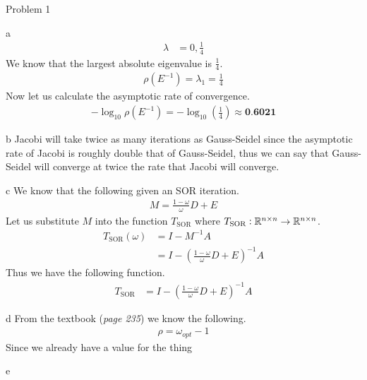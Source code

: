\begin{section}{Problem 1}
\begin{solution}{a}
\begin{align*}
            \lambda &= 0, \frac{1}{4}
        \end{align*}
        We know that the largest absolute eigenvalue is $\frac{1}{4}$.
        \begin{align*}
            \rho \left( E^{-1} \right) = \lambda_1 = \frac{1}{4}
        \end{align*}
        Now let us calculate the asymptotic rate of convergence.
        \begin{align*}
            - \log_{10} \rho \left( E^{-1} \right) = - \log_{10} \left( \frac{1}{4} \right) \approx \textbf{0.6021}
        \end{align*}
    \end{solution}

    \newpage

    \begin{solution}{b}
        Jacobi will take twice as many iterations as Gauss-Seidel since the asymptotic rate of Jacobi is roughly double that of Gauss-Seidel, thus we can say that Gauss-Seidel will converge at twice the rate that Jacobi will converge. 
    \end{solution}

    \newpage

    \begin{solution}{c}
        We know that the following given an SOR iteration.
        \begin{align*}
            M = \frac{1 - \omega}{\omega} D + E
        \end{align*}
        Let us substitute $M$ into the function $T_\text{SOR}$ where $T_\text{SOR} : \mathbb{R}^{n \times n} \rightarrow \mathbb{R}^{n \times n}$.
        \begin{align*}
            T_\text{SOR} (\omega) &= I - M^{-1} A \\
            &= I - \left( \frac{1 - \omega}{\omega} D + E \right)^{-1} A
        \end{align*}
        Thus we have the following function.
        \begin{align*}
            T_\text{SOR} &= I - \left( \frac{1 - \omega}{\omega} D + E \right)^{-1} A
        \end{align*}
    \end{solution}

    \newpage

    \begin{solution}{d}
        From the textbook (\textit{page 235}) we know the following.
        \begin{align*}
            \rho = \omega_{opt} - 1
        \end{align*}
        Since we already have a value for the thing
    \end{solution}

    \newpage 

    \begin{solution}{e}
    \end{solution}

\end{section}